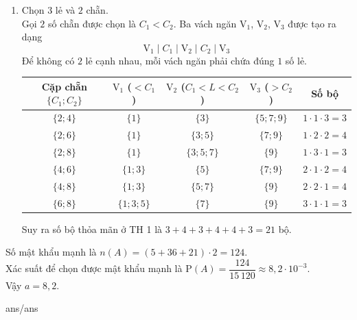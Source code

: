 \begin{ex}
{\begin{enumerate}[\it TH 1: ]
\begin{itemize}
				\item Hai số lẻ nhỏ hơn $ C_1$. Ta có bộ $\{1; 3; 4; 6; 8\}$ (ứng với cặp lẻ $\{1; 3\}$).
			\end{itemize}
			Suy ra số bộ thỏa mãn ở TH 2 là $40 - 4 = 36$ bộ.
			\item Chọn $3$ lẻ và $2$ chẵn. \\
			Gọi $2$ số chẵn được chọn là $C_1 < C_2$. Ba vách ngăn V$_1$, V$_2$, V$_3$ được tạo ra dạng
			\[\text{V}_1 \mid C_1 \mid \text{V}_2 \mid C_2 \mid \text{V}_3\]
			Để không có $2$ lẻ cạnh nhau, mỗi vách ngăn phải chứa đúng $1$ số lẻ.
			\begin{center}
				\begin{tabular}{|c|c|c|c|c|}
					\hline
					\rowcolor{gray!20} \textbf{Cặp chẵn} $\{C_1; C_2\}$ & $\text{V}_1$ ($<C_1$) & $\text{V}_2$ ($C_1<L<C_2$) & $\text{V}_3$ ($>C_2$) & \textbf{Số bộ} \\ \hline
					$\{2; 4\}$ & $\{1\}$ & $\{3\}$ & $\{5; 7; 9\}$ & $1 \cdot 1 \cdot 3 = 3$ \\ \hline
					$\{2; 6\}$ & $\{1\}$ & $\{3; 5\}$ & $\{7; 9\}$ & $1 \cdot 2 \cdot 2 = 4$ \\ \hline
					$\{2; 8\}$ & $\{1\}$ & $\{3; 5; 7\}$ & $\{9\}$ & $1 \cdot 3 \cdot 1 = 3$ \\ \hline
					$\{4; 6\}$ & $\{1; 3\}$ & $\{5\}$ & $\{7; 9\}$ & $2 \cdot 1 \cdot 2 = 4$ \\ \hline
					$\{4; 8\}$ & $\{1; 3\}$ & $\{5; 7\}$ & $\{9\}$ & $2 \cdot 2 \cdot 1 = 4$ \\ \hline
					$\{6; 8\}$ & $\{1; 3; 5\}$ & $\{7\}$ & $\{9\}$ & $3 \cdot 1 \cdot 1 = 3$ \\ \hline
				\end{tabular}
			\end{center}
			Suy ra số bộ thỏa mãn ở TH 1 là $3+4+3+4+4+3 = 21$ bộ.		
		\end{enumerate}
		Số mật khẩu mạnh là $n(A) = (5 + 36 + 21) \cdot 2 = 124$. \\
		Xác suất để chọn được mật khẩu mạnh là  $\mathrm{P}(A) = \dfrac{124}{15\,120} \approx 8{,}2 \cdot 10^{-3}$. \\
		Vậy $a =8{,}2$.
	}
\end{ex}

\begin{indapan}
	{ans/ans\currfilebase}
\end{indapan}